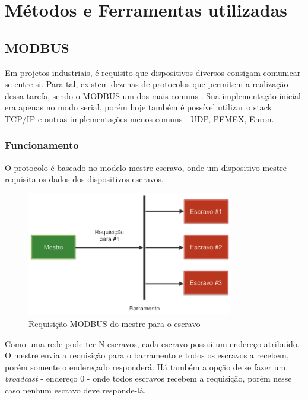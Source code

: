   \section{Métodos e Ferramentas utilizadas}
  \label{methodology:tools}

    \subsection{MODBUS}
    \label{methodology:tools:modbus}

      Em projetos industriais, é requisito que dispositivos diversos consigam comunicar-se entre si. Para tal, existem dezenas de protocolos que permitem a realização dessa tarefa, sendo o MODBUS um dos mais comuns \cite{modbus-spec-application}. Sua implementação inicial era apenas no modo serial, porém hoje também é possível utilizar o stack TCP/IP e outras implementações menos comuns - UDP, PEMEX, Enron.

      \subsubsection{Funcionamento}
      \label{methodology:tools:modbus:how}

        O protocolo é baseado no modelo mestre-escravo, onde um dispositivo mestre requisita os dados dos dispositivos escravos.

        \begin{figure}[H]
          \begin{center}
            \includegraphics[width=0.8\textwidth,natwidth=1024,natheight=768]{assets/images/modbus-req-1.png}
            \caption{Requisição MODBUS do mestre para o escravo}
            \label{fig:modbus-req-1}
          \end{center}
        \end{figure}

        Como uma rede pode ter N escravos, cada escravo possui um endereço atribuído. O mestre envia a requisição para o barramento e todos os escravos a recebem, porém somente o endereçado responderá. Há também a opção de se fazer um \textit{broadcast} - endereço 0 - onde todos escravos recebem a requisição, porém nesse caso nenhum escravo deve responde-lá.

